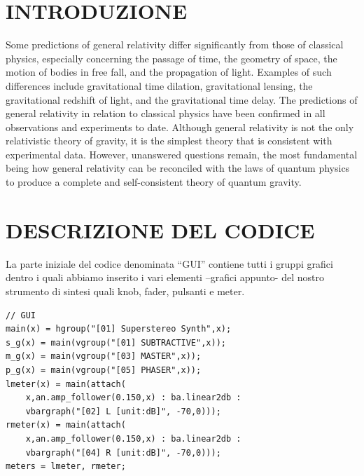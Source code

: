 \documentclass[
	a4paper,
	twocolumn
	]{article}
\begin{document}
\maketitle
\thispagestyle{empty}
\section*{INTRODUZIONE}
Some predictions of general relativity differ significantly from those of
classical physics, especially concerning the passage of time, the geometry of
space, the motion of bodies in free fall, and the propagation of light. Examples
of such differences include gravitational time dilation, gravitational lensing,
the gravitational redshift of light, and the gravitational time delay. The
predictions of general relativity in relation to classical physics have been
confirmed in all observations and experiments to date. Although general
relativity is not the only relativistic theory of gravity, it is the simplest
theory that is consistent with experimental data. However, unanswered questions
remain, the most fundamental being how general relativity can be reconciled with
the laws of quantum physics to produce a complete and self-consistent theory of
quantum gravity.
\section*{DESCRIZIONE DEL CODICE}
La parte iniziale del codice denominata “GUI” contiene tutti i gruppi grafici dentro i quali abbiamo inserito i vari elementi –grafici appunto- del nostro strumento di sintesi quali knob, fader, pulsanti e meter.

\begin{lstlisting}
// GUI
main(x) = hgroup("[01] Superstereo Synth",x);
s_g(x) = main(vgroup("[01] SUBTRACTIVE",x));
m_g(x) = main(vgroup("[03] MASTER",x));
p_g(x) = main(vgroup("[05] PHASER",x));
lmeter(x) = main(attach(
	x,an.amp_follower(0.150,x) : ba.linear2db :
	vbargraph("[02] L [unit:dB]", -70,0)));
rmeter(x) = main(attach(
	x,an.amp_follower(0.150,x) : ba.linear2db :
	vbargraph("[04] R [unit:dB]", -70,0)));
meters = lmeter, rmeter;
\end{lstlisting}
\end{document}
